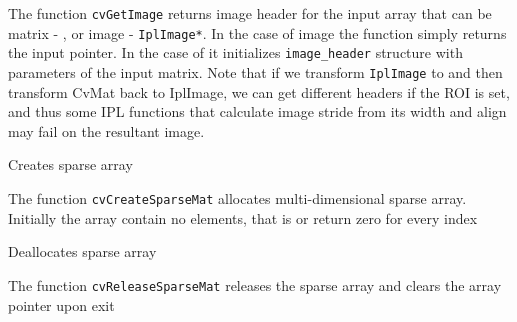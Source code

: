 \begin{description}
\end{description}

The function \texttt{cvGetImage} returns image header for the input array
that can be matrix - , or image - \texttt{IplImage*}. In
the case of image the function simply returns the input pointer. In the
case of  it initializes \texttt{image\_header} structure
with parameters of the input matrix. Note that if we transform
\texttt{IplImage} to  and then transform CvMat back to
IplImage, we can get different headers if the ROI is set, and thus some
IPL functions that calculate image stride from its width and align may
fail on the resultant image.

\label{CreateSparseMat}

Creates sparse array


\begin{description}
\end{description}

The function \texttt{cvCreateSparseMat} allocates multi-dimensional sparse array. Initially the array contain no elements, that is  or  return zero for every index

\label{ReleaseSparseMat}

Deallocates sparse array


\begin{description}
\end{description}


The function \texttt{cvReleaseSparseMat} releases the sparse array and clears the array pointer upon exit


